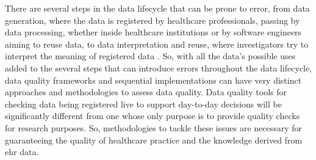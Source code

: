 There are several steps in the data lifecycle that can be prone to error, from data generation, where the data is registered by healthcare professionals, passing by data processing, whether inside healthcare institutions or by software engineers aiming to reuse data, to data interpretation and reuse, where investigators try to interpret the meaning of registered data \cite{wengClinicalDataQuality2020}.
So, with all the data's possible uses added to the several steps that can introduce errors throughout the data lifecycle, data quality frameworks and sequential implementations can have very distinct approaches and methodologies to assess data quality. Data quality tools for checking data being registered live to support day-to-day decisions will be significantly different from one whose only purpose is to provide quality checks for research purposes. So, methodologies to tackle these issues are necessary for guaranteeing the quality of healthcare practice and the knowledge derived from \ac{ehr} data. 

